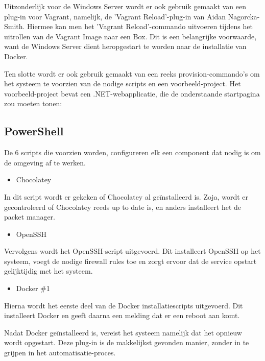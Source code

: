 
Uitzonderlijk voor de Windows Server wordt er ook gebruik gemaakt van een plug-in voor Vagrant, namelijk, de 'Vagrant Reload'-plug-in van Aidan Nagorcka-Smith. Hiermee kan men het 'Vagrant Reload'-commando uitvoeren tijdens het uitrollen van de Vagrant Image naar een Box. Dit is een belangrijke voorwaarde, want de Windows Server dient heropgestart te worden naar de installatie van Docker.


Ten slotte wordt er ook gebruik gemaakt van een reeks provision-commando's om het systeem te voorzien van de nodige scripts en een voorbeeld-project. Het voorbeeld-project bevat een .NET-webapplicatie, die de onderstaande startpagina zou moeten tonen:


\subsection{PowerShell}
De 6 scripts die voorzien worden, configureren elk een component dat nodig is om de omgeving af te werken.

\begin{itemize}[noitemsep]
	\item Chocolatey
\end{itemize}

In dit script wordt er gekeken of Chocolatey al geïnstalleerd is. Zoja, wordt er gecontroleerd of Chocolatey reeds up to date is, en anders installeert het de packet manager.

\begin{itemize}[noitemsep]
	\item OpenSSH
\end{itemize}

Vervolgens wordt het OpenSSH-script uitgevoerd. Dit installeert OpenSSH op het systeem, voegt de nodige firewall rules toe en zorgt ervoor dat de service opstart gelijktijdig met het systeem.

\begin{itemize}[noitemsep]
	\item Docker \#1
\end{itemize}

Hierna wordt het eerste deel van de Docker installatiescripts uitgevoerd. Dit installeert Docker en geeft daarna een melding dat er een reboot aan komt.

Nadat Docker geïnstalleerd is, vereist het systeem namelijk dat het opnieuw wordt opgestart. Deze plug-in is de makkelijkst gevonden manier, zonder in te grijpen in het automatisatie-proces.

